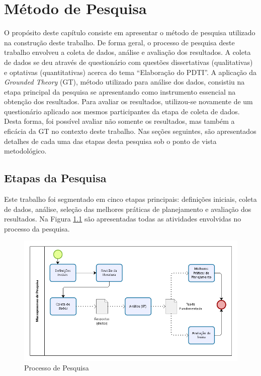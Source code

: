 \chapter{Método de Pesquisa}
\label{capitulo:metodo_pesquisa}
O propósito deste capítulo consiste em apresentar o método de pesquisa utilizado na construção deste trabalho. De forma geral, o processo de pesquisa deste trabalho envolveu a coleta de dados, análise e avaliação dos resultados. A coleta de dados se deu através de questionário com questões dissertativas (qualitativas) e optativas (quantitativas) acerca do tema ``Elaboração do PDTI''. A aplicação da \textit{Grounded Theory} (GT), método utilizado para análise dos dados, consistiu na etapa principal da pesquisa se apresentando como instrumento essencial na obtenção dos resultados. Para avaliar os resultados, utilizou-se novamente de um questionário aplicado aos mesmos participantes da etapa de coleta de dados. Desta forma, foi possível avaliar não somente os resultados, mas também a eficácia da GT no contexto deste trabalho. Nas seções seguintes, são apresentados detalhes de cada uma das etapas desta pesquisa sob o ponto de vista metodológico.

\section{Etapas da Pesquisa}
Este trabalho foi segmentado em cinco etapas principais: definições iniciais, coleta de dados, análise, seleção das melhores práticas de planejamento e avaliação dos resultados. Na Figura \ref{figura:processoPesquisa} são apresentadas todas as atividades envolvidas no processo da pesquisa.

\begin{figure}[h]
\centering %
\includegraphics[width=15cm]{figuras/processoPesquisa.png}
\caption{Processo de Pesquisa}
\label{figura:processoPesquisa}
\end{figure}

